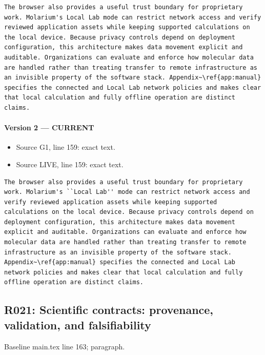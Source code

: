 \documentclass[11pt]{article}
\begin{document}
\begin{lstlisting}
The browser also provides a useful trust boundary for proprietary work. Molarium's Local Lab mode can restrict network access and verify reviewed application assets while keeping supported calculations on the local device. Because privacy controls depend on deployment configuration, this architecture makes data movement explicit and auditable. Organizations can evaluate and enforce how molecular data are handled rather than treating transfer to remote infrastructure as an invisible property of the software stack. Appendix~\ref{app:manual} specifies the connected and Local Lab network policies and makes clear that local calculation and fully offline operation are distinct claims.
\end{lstlisting}

\paragraph{Version 2 --- CURRENT}

\begin{itemize}[leftmargin=*]
\item Source G1, line 159: exact text.
\item Source LIVE, line 159: exact text.
\end{itemize}

\begin{lstlisting}
The browser also provides a useful trust boundary for proprietary work. Molarium's ``Local Lab'' mode can restrict network access and verify reviewed application assets while keeping supported calculations on the local device. Because privacy controls depend on deployment configuration, this architecture makes data movement explicit and auditable. Organizations can evaluate and enforce how molecular data are handled rather than treating transfer to remote infrastructure as an invisible property of the software stack. Appendix~\ref{app:manual} specifies the connected and Local Lab network policies and makes clear that local calculation and fully offline operation are distinct claims.
\end{lstlisting}

\subsection{R021: Scientific contracts: provenance, validation, and falsifiability}

Baseline main.tex line 163; paragraph.
\end{document}
